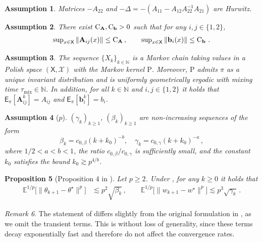 \documentclass{article}
\newtheorem{proposition}{Proposition}[section]
\theoremstyle{definition}
\theoremstyle{remark}
\newtheorem{remark}[proposition]{Remark}
\theoremstyle{plain}
\newtheorem{assumption}[proposition]{Assumption}
\newcommand{\E}{\mathbb{E}}
\newcommand{\MKQ}{\mathrm{P}}
\def\nset{\mathbb{N}}
\newcommand{\tmix}{\tau_{\mathrm{mix}}}
\def\eqsp{\,}
\def\Xset{\mathsf{X}}
\def\Xsigma{\mathcal{X}}
\def\PE{\mathsf{E}}
\newcommand{\bConst}[1]{\operatorname{C}_{{\bf #1}}}
\def\funcbw{\mathbf{b}}
\def\funcAw{\mathbf{A}}
\numberwithin{equation}{section}
\begin{document}
\begin{assumption}
\label{assum:hurwitz}
Matrices $-A_{22}$ and $ - \Delta =-\left(A_{11}-A_{12}A_{22}^{-1}A_{21}\right)$ are \textit{Hurwitz}. 
\end{assumption}
\begin{assumption}
\label{assum:aij_bound}
There exist $\bConst{A}, \bConst{b} > 0$ such that for any $i, j \in \{1, 2\}$, 
\begin{align}
\sup\nolimits_{x \in \Xset} \|\funcAw_{ij}(x)\| \leq \bConst{A}\eqsp, \qquad \sup\nolimits_{x \in \Xset} \|\funcbw_{i}(x)\|   \leq \bConst{b} \,.
\end{align}
\end{assumption}
\begin{assumption}
\label{assum:UGE_ttsa}
The sequence $\{X_k\}_{k \in \nset}$ is a Markov chain taking values in a Polish space $(\Xset,\Xsigma)$ with the Markov kernel $\MKQ$. Moreover, $\MKQ$ admits $\pi$ as a unique invariant distribution and is uniformly geometrically ergodic with mixing time $\tmix \in \nset$. In addition, for all $k \in \nset$ and $i, j \in \{1,2\}$ it holds that \(
    \PE_\pi[\funcAw_{ij}^k] = A_{ij}\) and   \(\PE_\pi[\funcbw_i^k] = b_i\).
\end{assumption}
\begin{assumption}[$p$]
\label{assum:markov:stepsize}
$(\gamma_k)_{k \geq 1}$, $(\beta_k)_{k \geq 1}$ are non-increasing sequences of the form 
\[
\textstyle 
\beta_k = c_{0, \beta} (k+k_0)^{-b}, \quad \gamma_k = c_{0, \gamma} (k+k_0)^{-a} \eqsp, 
\]  
where \(1/2 < a < b < 1\), the ratio  $c_{0,\beta}/c_{0,\gamma}$ is sufficiently small, and the constant $k_0$ satisfies the bound $k_0 \gtrsim p^{4/b}$.
\end{assumption}
\begin{proposition}[Proposition 4 in \cite{butyrin2026gaussian}]
\label{prop:markov:moment_bounds}
Let $p \geq 2 $. Under , for any $k \geq 0$ it holds that 
\begin{align}
\label{eq:markov:main_ttheta_bound}
\E^{1/p}\big[\|\theta_{k+1} - \theta^\star\|^p\big]&  \lesssim  p^2 \sqrt{\beta_k} \eqsp, \qquad 
\E^{1/p}\big[\|w_{k+1} - w^\star\|^p\big]   \lesssim  p^3 \sqrt{\gamma_k} \eqsp.
\end{align}
\end{proposition}
\begin{remark}
The statement of  differs slightly from the original formulation in \cite{butyrin2026gaussian}, as we omit the transient terms. This is without loss of generality, since these terms decay exponentially fast and therefore do not affect the convergence rates.
\end{remark}
\end{document}
